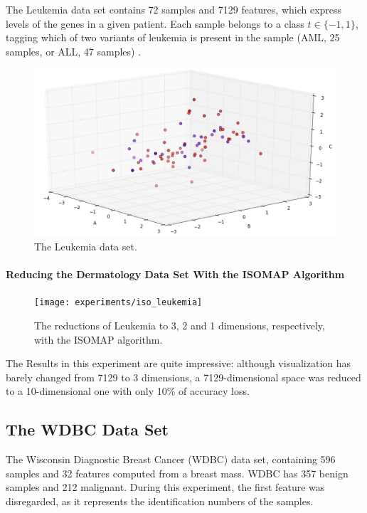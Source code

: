 The Leukemia data set contains 72 samples and 7129 features, which express levels of the genes in a given patient. Each sample belongs to a class $t \in \{-1, 1\}$, tagging which of two variants of leukemia is present in the sample (AML, 25 samples, or ALL, 47 samples) \cite{on:duc_ds}.

\begin{figure}[H]
	\centering
	\includegraphics[width=\linewidth]{img/datasets/leukemia}
	\captionsetup{justification=centering}
	\caption{The Leukemia data set.}
\end{figure}

\newpage
\paragraph{Reducing the Dermatology Data Set With the ISOMAP Algorithm}

\begin{figure}[H]
	\centering
	\captionsetup{justification=centering}
	\texttt{[image: experiments/iso\_leukemia]}
	\caption{The reductions of Leukemia to 3, 2 and 1 dimensions, respectively, with the ISOMAP algorithm.}
	\label{fig:dsleukemiaiso}
\end{figure}

The Results in this experiment are quite impressive: although visualization has barely changed from 7129 to 3 dimensions, a 7129-dimensional space was reduced to a 10-dimensional one with only 10\% of accuracy loss.

\clearpage
\subsection{The WDBC Data Set}

The Wisconsin Diagnostic Breast Cancer (WDBC) data set, containing 596 samples and 32 features computed from a breast mass. WDBC has 357 benign samples and 212 malignant. During this experiment, the first feature was disregarded, as it represents the identification numbers of the samples.

